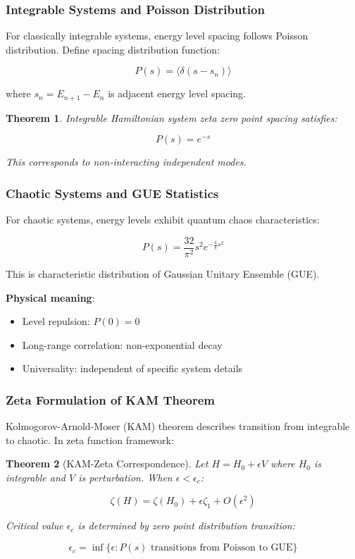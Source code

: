 \documentclass[12pt,a4paper]{article}
\newtheorem{theorem}{Theorem}[section]
\begin{document}
\subsubsection{Integrable Systems and Poisson Distribution}

For classically integrable systems, energy level spacing follows Poisson distribution. Define spacing distribution function:

$$P(s) = \langle \delta(s - s_n) \rangle$$

where $s_n = E_{n+1} - E_n$ is adjacent energy level spacing.

\begin{theorem}
Integrable Hamiltonian system zeta zero point spacing satisfies:

$$P(s) = e^{-s}$$

This corresponds to non-interacting independent modes.
\end{theorem}

\subsubsection{Chaotic Systems and GUE Statistics}

For chaotic systems, energy levels exhibit quantum chaos characteristics:

$$P(s) = \frac{32}{\pi^2} s^2 e^{-\frac{4}{\pi}s^2}$$

This is characteristic distribution of Gaussian Unitary Ensemble (GUE).

\textbf{Physical meaning}:
\begin{itemize}
\item Level repulsion: $P(0) = 0$
\item Long-range correlation: non-exponential decay
\item Universality: independent of specific system details
\end{itemize}

\subsubsection{Zeta Formulation of KAM Theorem}

Kolmogorov-Arnold-Moser (KAM) theorem describes transition from integrable to chaotic. In zeta function framework:

\begin{theorem}[KAM-Zeta Correspondence]
Let $H = H_0 + \epsilon V$ where $H_0$ is integrable and $V$ is perturbation. When $\epsilon < \epsilon_c$:

$$\zeta(H) = \zeta(H_0) + \epsilon \zeta_1 + O(\epsilon^2)$$

Critical value $\epsilon_c$ is determined by zero point distribution transition:

$$\epsilon_c = \inf\{\epsilon : P(s) \text{ transitions from Poisson to GUE}\}$$
\end{theorem}
\end{document}
